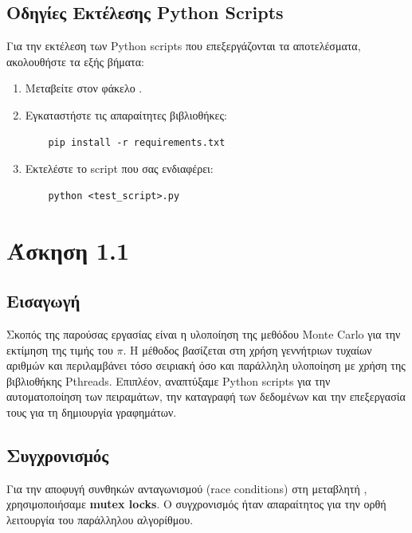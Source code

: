 \documentclass{article}
\begin{document}
\subsection*{Οδηγίες Εκτέλεσης Python Scripts}
Για την εκτέλεση των Python scripts που επεξεργάζονται τα αποτελέσματα, ακολουθήστε τα εξής βήματα:
\begin{enumerate}
    \item Μεταβείτε στον φάκελο .
    \item Εγκαταστήστε τις απαραίτητες βιβλιοθήκες:
    \begin{verbatim}
    pip install -r requirements.txt
    \end{verbatim}
    \item Εκτελέστε το script που σας ενδιαφέρει:
    \begin{verbatim}
    python <test_script>.py
    \end{verbatim}
\end{enumerate}

\section*{Άσκηση 1.1}
\subsection*{Εισαγωγή}
Σκοπός της παρούσας εργασίας είναι η υλοποίηση της μεθόδου Monte Carlo για την εκτίμηση της τιμής του 
$\pi$. Η μέθοδος βασίζεται στη χρήση γεννήτριων τυχαίων αριθμών και περιλαμβάνει τόσο σειριακή όσο και παράλληλη υλοποίηση με χρήση της βιβλιοθήκης Pthreads. Επιπλέον, αναπτύξαμε Python scripts για την αυτοματοποίηση των πειραμάτων, την καταγραφή των δεδομένων και την επεξεργασία τους για τη δημιουργία γραφημάτων.


\subsection*{Συγχρονισμός}
Για την αποφυγή συνθηκών ανταγωνισμού (race conditions) στη μεταβλητή , χρησιμοποιήσαμε \textbf{mutex locks}. Ο συγχρονισμός ήταν απαραίτητος για την ορθή λειτουργία του παράλληλου αλγορίθμου.
\end{document}
